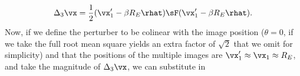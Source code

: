 \begin{equation}
\Delta_3 \vx = \frac{1}{2} (\vx'_1 - \beta R_E \rhat) \sF (\vx'_1 - \beta R_E \rhat).
\end{equation}
Now, if we define the perturber to be colinear with the image position ($\theta  = 0$, if we take the full root mean square yields an extra factor of $\sqrt{2}$ that we omit for simplicity) and that the positions of the multiple images are $\vx'_1 \approx \vx_1 \approx R_E$, and take the magnitude of $\Delta_3 \vx$, we can substitute in